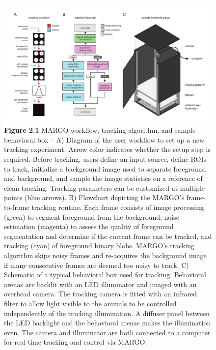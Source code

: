 \documentclass[12pt,letterpaper]{article}
\begin{document}
\begin{figure}[t!]
    \includegraphics[width=\textwidth]{../figures/chapter_2/fig_2-1.pdf}
    \vspace{.1in}
    \caption*{\textbf{Figure 2.1} MARGO workflow, tracking algorithm, and sample behavioral box -- A) Diagram of the user workflow to set up a new tracking experiment. Arrow color indicates whether the setup step is required. Before tracking, users define an input source, define ROIs to track, initialize a background image used to separate foreground and background, and sample the image statistics on a reference of clean tracking. Tracking parameters can be customized at multiple points (blue arrows). B) Flowchart depicting the MARGO's frame-to-frame tracking routine. Each frame consists of image processing (green) to segment foreground from the background, noise estimation (magenta) to assess the quality of foreground segmentation and determine if the current frame can be tracked, and tracking (cyan) of foreground binary blobs. MARGO's tracking algorithm skips noisy frames and re-acquires the background image if many consecutive frames are deemed too noisy to track. C) Schematic of a typical behavioral box used for tracking. Behavioral arenas are backlit with an LED illuminator and imaged with an overhead camera. The tracking camera is fitted with an infrared filter to allow light visible to the animals to be controlled independently of the tracking illumination. A diffuser panel between the LED backlight and the behavioral arenas makes the illumination even. The camera and illuminator are both connected to a computer for real-time tracking and control via MARGO.}
\end{figure}
\end{document}
